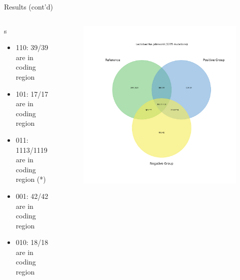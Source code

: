 \documentclass{beamer}
\begin{document}
\begin{frame}{Results (cont'd)}
	\begin{columns}
		\footnotesize{
			\begin{column}{.58\textwidth}
				s\textunderscore\@\textunderscore\@Lactobacillus\textunderscore\@johnsonii
				\begin{itemize}
					\item 110: 39/39 are in coding region
					\item 101: 17/17 are in coding region
					\item 011: 1113/1119 are in coding region (*)
					\item 001: 42/42 are in coding region
					\item 010: 18/18 are in coding region
				\end{itemize}
			\end{column}
		}
		\begin{column}{.48\textwidth}
			\begin{figure}[ht]
				\centering
				\includegraphics[width=1\textwidth]{img/Lactobacillus-johnsonii-venn.png}
				\caption*{\label{fig:Lactobacillus-venn}}
			\end{figure}
		\end{column}
	\end{columns}
\end{frame}
\end{document}
